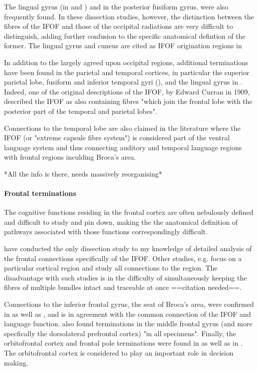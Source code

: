 The lingual gyrus (in \textcite{Sarubbo2013} and \textcite{Hau2016}) and in \textcite{Martino2010} the posterior fusiform gyrus, were also frequently found.
In these dissection studies, however, the distinction between the fibres of the IFOF and those of the occipital radiations are very difficult to distinguish, adding further confusion to the specific anatomical defintion of the former.
The lingual gyrus and cuneus are cited as IFOF origination regions in \textcite{Palejwala2021}

In addition to the largely agreed upon occipital regions, additional terminations have been found in the parietal and temporal cortices, in particular the superior parietal lobe, fusiform and inferior temporal gyri (\autocite{Martino2010}), and the lingual gyrus in \textcite{Sarubbo2013}.
Indeed, one of the original descriptions of the IFOF, by Edward Curran in 1909, described the IFOF as also containing fibres "which join the frontal lobe with the posterior part of the temporal and parietal lobes". \autocite{Forkel2014a}

Connections to the temporal lobe are also claimed in the literature where the IFOF (or "extreme capsule fibre system") is considered part of the ventral language system and thus connecting auditory and temporal language regions with frontal regions inculding Broca's area. \autocite{Friederici2013a} \autocite{Kummerer2013}

*All the info is there, needs massively reorganising*

\paragraph*{Frontal terminations}

The cognitive functions residing in the frontal cortex are often nebulously defined and difficult to study and pin down, making the the anatomical definition of pathways associated with those functions correspondingly difficult.

\textcite{Sarubbo2013} have conducted the only dissection study to my knowledge of detailed analysis of the frontal connections specifically of the IFOF. Other studies, e.g. \textcite{Burks2017} focus on a particular cortical region and study all connections to the region. The disadvantage with such studies is in the difficulty of simultaneously keeping the fibres of multiple bundles intact and traceable at once ==citation needed==.

Connections to the inferior frontal gyrus, the seat of Broca's area, were confirmed in \textcite{Sarubbo2013} as well as \textcite{Hau2016}, and is in agreement with the common connection of the IFOF and language function.
\textcite{Sarubbo2013} also found terminations in the middle frontal gyrus (and more specfically the dorsolateral prefrontal cortex) "in all specimens".
Finally, the orbitofrontal cortex and frontal pole terminations were found in \textcite{Sarubbo2013} as well as in \textcite{Burks2017}.
The orbitofrontal cortex is considered to play an important role in decision making. \autocite{Burks2017}

